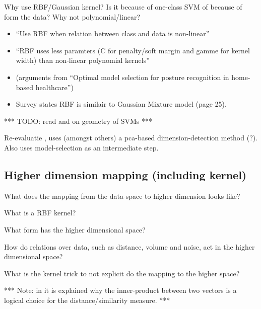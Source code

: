 Why use RBF/Gaussian kernel? Is it because of one-class SVM of because of form the data? Why not polynomial/linear?
\begin{itemize}
  \item ``Use RBF when relation between class and data is non-linear''
  \item ``RBF uses less paramters (C for penalty/soft margin and gamme for kernel width) than non-linear polynomial kernels''
  \item (arguments from \cite{zhang2011optimal} ``Optimal model selection for posture recognition in home-based healthcare'')
  \item Survey \cite{hodge2004survey} states RBF is similair to Gaussian Mixture model (page 25).
\end{itemize}



*** TODO: read \cite{mavroforakis2006geometric} and \cite{bennett2000duality} on geometry of SVMs ***


Re-evaluatie \cite{guo2012adaptive}, uses (amongst others) a pca-based dimension-detection method (?).
Also uses model-selection as an intermediate step.


\subsection{Higher dimension mapping (including kernel)}
What does the mapping from the data-space to higher dimension looks like?

What is a RBF kernel?

What form has the higher dimensional space?

How do relations over data, such as distance, volume and noise, act in the higher dimensional space?

What is the kernel trick to not explicit do the mapping to the higher space?


*** Note: in \cite{mavroforakis2006geometric} it is explained why the inner-product between two vectors is a logical choice for the distance/similarity measure. ***


